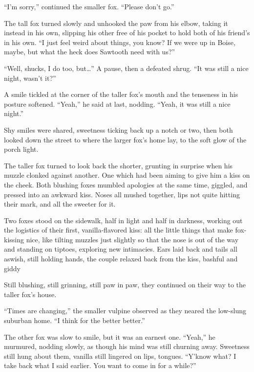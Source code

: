 ``I'm sorry,'' continued the smaller fox. ``Please don't go.''

The tall fox turned slowly and unhooked the paw from his elbow, taking it instead in his own, slipping his other free of his pocket to hold both of his friend's in his own. ``I just feel weird about things, you know? If we were up in Boise, maybe, but what the heck does Sawtooth need with us?''

``Well, shucks, I do too, but\ldots{}'' A pause, then a defeated shrug. ``It was still a nice night, wasn't it?''

A smile tickled at the corner of the taller fox's mouth and the tenseness in his posture softened. ``Yeah,'' he said at last, nodding. ``Yeah, it was still a nice night.''

Shy smiles were shared, sweetness ticking back up a notch or two, then both looked down the street to where the larger fox's home lay, to the soft glow of the porch light.

The taller fox turned to look back the shorter, grunting in surprise when his muzzle clonked against another. One which had been aiming to give him a kiss on the cheek. Both blushing foxes mumbled apologies at the same time, giggled, and pressed into an awkward kiss. Noses all mushed together, lips not quite hitting their mark, and all the sweeter for it.

Two foxes stood on the sidewalk, half in light and half in darkness, working out the logistics of their first, vanilla-flavored kiss: all the little things that make fox-kissing nice, like tilting muzzles just slightly so that the nose is out of the way and standing on tiptoes, exploring new intimacies. Ears laid back and tails all aswish, still holding hands, the couple relaxed back from the kiss, bashful and giddy

Still blushing, still grinning, still paw in paw, they continued on their way to the taller fox's house.

``Times are changing,'' the smaller vulpine observed as they neared the low-slung suburban home. ``I think for the better better.''

The other fox was slow to smile, but it was an earnest one. ``Yeah,'' he murmured, nodding slowly, as though his mind was still churning away. Sweetness still hung about them, vanilla still lingered on lips, tongues. ``Y'know what? I take back what I said earlier. You want to come in for a while?''
